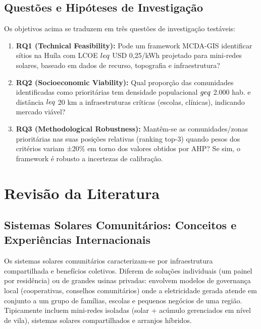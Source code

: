 \documentclass[12pt, a4paper]{article}
\begin{document}
\subsection{Questões e Hipóteses de Investigação}

Os objetivos acima se traduzem em três questões de investigação testáveis:

\begin{enumerate}
\item \textbf{RQ1 (Technical Feasibility):} Pode um framework MCDA-GIS identificar sítios na Huíla com LCOE $\\leq$ USD 0,25/kWh projetado para mini-redes solares, baseado em dados de recurso, topografia e infraestrutura?

\item \textbf{RQ2 (Socioeconomic Viability):} Qual proporção das comunidades identificadas como prioritárias tem densidade populacional $\\geq$ 2.000 hab. e distância $\\leq$ 20 km a infraestruturas críticas (escolas, clínicas), indicando mercado viável?

\item \textbf{RQ3 (Methodological Robustness):} Mantêm-se as comunidades/zonas prioritárias nas suas posições relativas (ranking top-3) quando pesos dos critérios variam ±20\% em torno dos valores obtidos por AHP? Se sim, o framework é robusto a incertezas de calibração.
\end{enumerate}

\section{Revisão da Literatura}

\subsection{Sistemas Solares Comunitários: Conceitos e Experiências Internacionais}

Os sistemas solares comunitários caracterizam-se por infraestrutura compartilhada e benefícios coletivos. Diferem de soluções individuais (um painel por residência) ou de grandes usinas privadas: envolvem modelos de governança local (cooperativas, conselhos comunitários) onde a eletricidade gerada atende em conjunto a um grupo de famílias, escolas e pequenos negócios de uma região. Tipicamente incluem mini-redes isoladas (solar + acúmulo gerenciados em nível de vila), sistemas solares compartilhados e arranjos híbridos.
\end{document}
